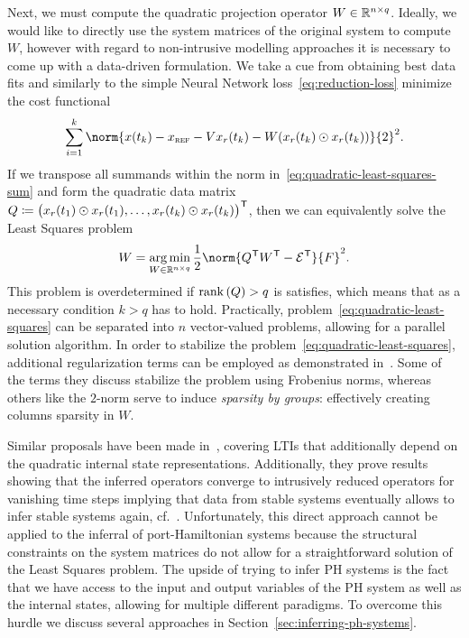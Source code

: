 Next, we must compute the quadratic projection operator $W \in \mathbb{R}^{n \times q}$.
Ideally, we would like to directly use the system matrices of the original system to compute $W$, however with regard to non-intrusive modelling approaches it is necessary to come up with a data-driven formulation.
We take a cue from obtaining best data fits and similarly to the simple Neural Network loss~\eqref{eq:reduction-loss} minimize the cost functional
\begin{equation}\label{eq:quadratic-least-squares-sum}
    \sum\limits_{i = 1}^k \norm{x(t_k) - x_\msc{ref} - V x_r(t_k) - W (x_r(t_k) \odot x_r(t_k))}{2}^2.
\end{equation}
If we transpose all summands within the norm in~\eqref{eq:quadratic-least-squares-sum} and form the quadratic data matrix $Q \coloneqq {\big( x_r(t_1) \odot x_r(t_1), \dots, x_r(t_k) \odot x_r(t_k) \big)}^{\mkern1mu \mathsf{T}}$, then we can equivalently solve the Least Squares problem
\begin{equation}\label{eq:quadratic-least-squares}
    W = \argmin\limits_{W \in \bb{R}^{n \times q}} \frac{1}{2} \norm{Q\trans W\trans - \mcl{E}\trans}{F}^2.
\end{equation}
This problem is overdetermined if $\mathop{}\!\mathrm{rank}\left(Q\right) > q$ is satisfies, which means that as a necessary condition $k > q$ has to hold.
Practically, problem~\eqref{eq:quadratic-least-squares} can be separated into $n$ vector-valued problems, allowing for a parallel solution algorithm.
In order to stabilize the problem~\eqref{eq:quadratic-least-squares}, additional regularization terms can be employed as demonstrated in~\cite[Equation~15]{Geelen2023}.
Some of the terms they discuss stabilize the problem using Frobenius norms, whereas others like the $2$-norm serve to induce \emph{sparsity by groups}: effectively creating columns sparsity in $W$.



Similar proposals have been made in~\cite{Peherstorfer2016}, covering \acp{LTI} that additionally depend on the quadratic internal state representations.
Additionally, they prove results showing that the inferred operators converge to intrusively reduced operators for vanishing time steps implying that data from stable systems eventually allows to infer stable systems again, cf.~\cite[Theorem~1, Corollary~1]{Peherstorfer2016}.
Unfortunately, this direct approach cannot be applied to the inferral of port-Hamiltonian systems because the structural constraints on the system matrices do not allow for a straightforward solution of the Least Squares problem.
The upside of trying to infer \ac{PH} systems is the fact that we have access to the input and output variables of the \ac{PH} system as well as the internal states, allowing for multiple different paradigms.
To overcome this hurdle we discuss several approaches in Section~\ref{sec:inferring-ph-systems}.
